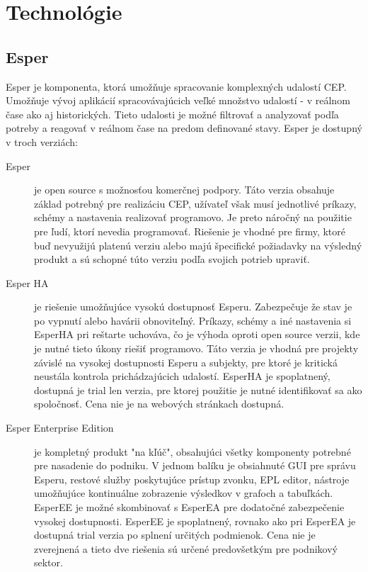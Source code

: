 \chapter{Technológie}
\label{chap:technologie}

\section{Esper}
	Esper je komponenta, ktorá umožňuje spracovanie komplexných udalostí \ac{CEP}. Umožňuje vývoj aplikácií spracovávajúcich veľké množstvo udalostí - v reálnom čase ako aj historických. Tieto udalosti je možné filtrovať a analyzovať podľa potreby a reagovať v reálnom čase na predom definované stavy.  Esper je dostupný v troch verziách:
	\begin{description}
		\item[Esper] je open source s možnosťou komerčnej podpory. Táto verzia obsahuje základ potrebný pre realizáciu CEP, užívateľ však musí jednotlivé príkazy, schémy a nastavenia realizovať programovo. Je preto náročný na použitie pre ľudí, ktorí nevedia programovať. Riešenie je vhodné pre firmy, ktoré buď nevyužijú platenú verziu alebo majú špecifické požiadavky na výsledný produkt a sú schopné túto verziu podľa svojich potrieb upraviť.
		
		\item[Esper HA] je riešenie umožňujúce vysokú dostupnosť Esperu. Zabezpečuje že stav je po vypnutí alebo havárii obnoviteľný. Príkazy, schémy a iné nastavenia si EsperHA pri reštarte uchováva, čo je výhoda oproti open source verzii, kde je nutné tieto úkony riešiť programovo. Táto verzia je vhodná pre projekty závislé na vysokej dostupnosti Esperu a subjekty, pre ktoré je kritická neustála kontrola prichádzajúcich udalostí.
		EsperHA je spoplatnený, dostupná je trial len verzia, pre ktorej použitie je nutné identifikovať sa ako spoločnosť. Cena nie je na webových stránkach dostupná.
		
		\item[Esper Enterprise Edition] je kompletný produkt "na kľúč", obsahujúci všetky komponenty potrebné pre nasadenie do podniku. V jednom balíku je obsiahnuté GUI pre správu Esperu, restové služby poskytujúce prístup zvonku, \ac{EPL} editor, nástroje umožňujúce kontinuálne zobrazenie výsledkov v grafoch a tabuľkách. EsperEE je možné skombinovať s EsperEA pre dodatočné zabezpečenie vysokej dostupnosti. EsperEE je spoplatnený, rovnako ako pri EsperEA je dostupná trial verzia po splnení určitých podmienok. Cena nie je zverejnená a tieto dve riešenia sú určené predovšetkým pre podnikový sektor.
	\end{description}
	
